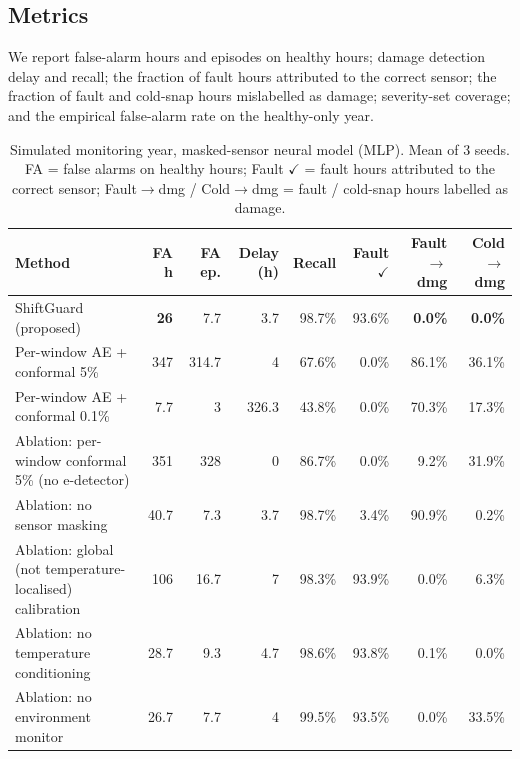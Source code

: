 \documentclass[conference]{IEEEtran}
\begin{document}
\subsection{Metrics}
We report false-alarm hours and episodes on healthy hours; damage detection delay and recall; the fraction of fault hours attributed to the correct sensor; the fraction of fault and cold-snap hours mislabelled as damage; severity-set coverage; and the empirical false-alarm rate on the healthy-only year.

\newcommand{\rowh}{Method & FA h & FA ep. & Delay (h) & Recall & Fault $\checkmark$ & Fault$\to$dmg & Cold$\to$dmg \\}
\begin{table}[t]
\centering
\caption{Simulated monitoring year, masked-sensor neural model (MLP). Mean of 3 seeds. FA = false alarms on healthy hours; Fault $\checkmark$ = fault hours attributed to the correct sensor; Fault$\to$dmg / Cold$\to$dmg = fault / cold-snap hours labelled as damage.}
\label{tab:mlp}
\begin{tabular}{lrrrrrrr}
\toprule
\rowh
\midrule
ShiftGuard (proposed) & \textbf{26} & 7.7 & 3.7 & 98.7\% & 93.6\% & \textbf{0.0\%} & \textbf{0.0\%} \\
Per-window AE + conformal 5\% & 347 & 314.7 & 4 & 67.6\% & 0.0\% & 86.1\% & 36.1\% \\
Per-window AE + conformal 0.1\% & 7.7 & 3 & 326.3 & 43.8\% & 0.0\% & 70.3\% & 17.3\% \\
Ablation: per-window conformal 5\% (no e-detector) & 351 & 328 & 0 & 86.7\% & 0.0\% & 9.2\% & 31.9\% \\
Ablation: no sensor masking & 40.7 & 7.3 & 3.7 & 98.7\% & 3.4\% & 90.9\% & 0.2\% \\
Ablation: global (not temperature-localised) calibration & 106 & 16.7 & 7 & 98.3\% & 93.9\% & 0.0\% & 6.3\% \\
Ablation: no temperature conditioning & 28.7 & 9.3 & 4.7 & 98.6\% & 93.8\% & 0.1\% & 0.0\% \\
Ablation: no environment monitor & 26.7 & 7.7 & 4 & 99.5\% & 93.5\% & 0.0\% & 33.5\% \\
\bottomrule
\end{tabular}
\end{table}
\end{document}
